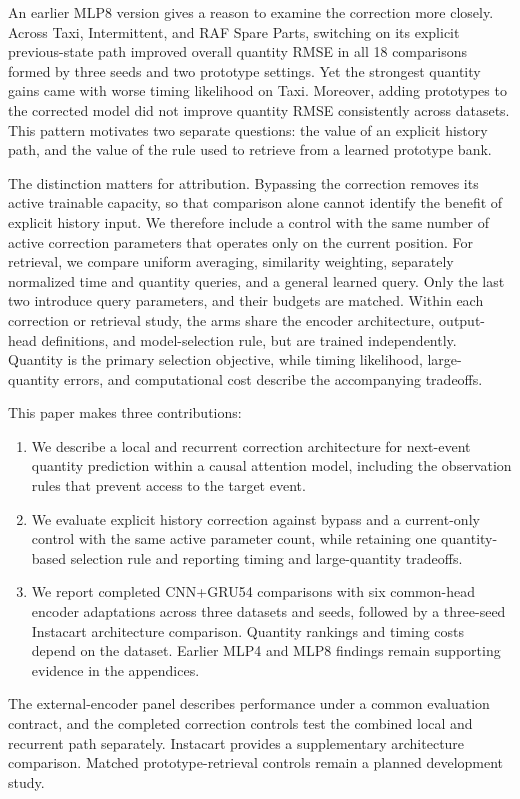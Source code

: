 \documentclass[runningheads]{llncs}
\begin{document}
An earlier MLP8 version gives a reason to examine the correction more closely.
Across Taxi, Intermittent, and RAF Spare Parts, switching on its explicit previous-state path improved overall quantity RMSE in all 18 comparisons formed by three seeds and two prototype settings.
Yet the strongest quantity gains came with worse timing likelihood on Taxi.
Moreover, adding prototypes to the corrected model did not improve quantity RMSE consistently across datasets.
This pattern motivates two separate questions: the value of an explicit history path, and the value of the rule used to retrieve from a learned prototype bank.

The distinction matters for attribution.
Bypassing the correction removes its active trainable capacity, so that comparison alone cannot identify the benefit of explicit history input.
We therefore include a control with the same number of active correction parameters that operates only on the current position.
For retrieval, we compare uniform averaging, similarity weighting, separately normalized time and quantity queries, and a general learned query.
Only the last two introduce query parameters, and their budgets are matched.
Within each correction or retrieval study, the arms share the encoder architecture, output-head definitions, and model-selection rule, but are trained independently.
Quantity is the primary selection objective, while timing likelihood, large-quantity errors, and computational cost describe the accompanying tradeoffs.

This paper makes three contributions:
\begin{enumerate}
\item We describe a local and recurrent correction architecture for next-event quantity prediction within a causal attention model, including the observation rules that prevent access to the target event.
\item We evaluate explicit history correction against bypass and a current-only control with the same active parameter count, while retaining one quantity-based selection rule and reporting timing and large-quantity tradeoffs.
\item We report completed CNN+GRU54 comparisons with six common-head encoder adaptations across three datasets and seeds, followed by a three-seed Instacart architecture comparison. Quantity rankings and timing costs depend on the dataset. Earlier MLP4 and MLP8 findings remain supporting evidence in the appendices.
\end{enumerate}
The external-encoder panel describes performance under a common evaluation contract, and the completed correction controls test the combined local and recurrent path separately. Instacart provides a supplementary architecture comparison. Matched prototype-retrieval controls remain a planned development study.
\end{document}
